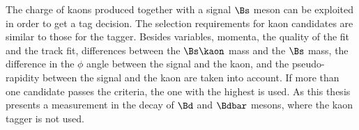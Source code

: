 The charge of kaons produced together with a signal $\Bs$ meson can be exploited
in order to get a tag decision. The selection requirements for kaon candidates
are similar to those for the \SSpi tagger. Besides \PID variables, momenta, the
quality of the \IP fit and the track fit, differences between the $\Bs\kaon$
mass and the $\Bs$ mass, the difference in the $\phi$ angle between the signal
\Bmeson and the kaon, and the pseudo-rapidity between the signal \Bmeson and the
kaon are taken into account. If more than one candidate passes the criteria, the
one with the highest \pT is used. As this thesis presents a measurement in the
decay of $\Bd$ and $\Bdbar$ mesons, where the kaon tagger is not used.

